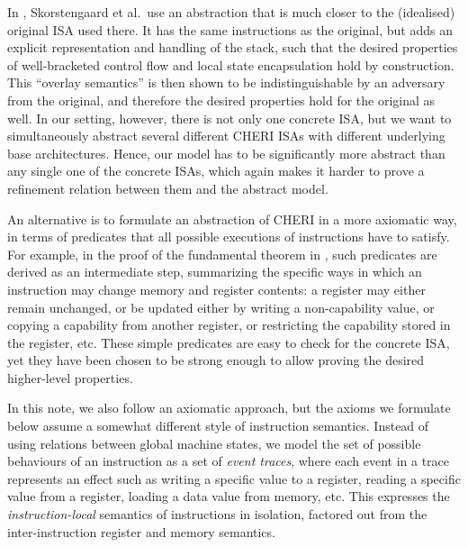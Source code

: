 \documentclass[11pt]{article}
\theoremstyle{definition}
\begin{document}
In \cite{StkTokens}, Skorstengaard et al.~use an abstraction that is
much closer to the (idealised) original ISA used there.
It has the same instructions as the original, but adds an explicit representation and handling of the stack, such that the desired properties of well-bracketed control flow and local state encapsulation hold by construction.
This ``overlay semantics'' is then shown to be indistinguishable by an
adversary from the original, and therefore the desired properties hold for the original as well.
In our setting, however, there is not only one concrete ISA, but we want to simultaneously abstract several different CHERI ISAs with different underlying base architectures.
Hence, our model has to be significantly more abstract than any single one of the concrete ISAs, which again makes it harder to prove a refinement relation between them and the abstract model.

An alternative is to formulate an abstraction of CHERI in a more axiomatic way, in terms of predicates that all possible executions of instructions have to satisfy.
For example, in the proof of the fundamental theorem in \cite{DBLP:conf/esop/SkorstengaardDB18}, such predicates are derived as an intermediate step, summarizing the specific ways in which an instruction may change memory and register contents:
a register may either remain unchanged, or be updated either by writing a non-capability value, or copying a capability from another register, or restricting the capability stored in the register, etc.
These simple predicates are easy to check for the concrete ISA, yet they have been chosen to be strong enough to allow proving the desired higher-level properties.



In this note, we also follow an axiomatic approach, but the axioms we
formulate below assume a somewhat different style of instruction semantics.
Instead of using relations between global machine states, we model the set of possible behaviours of an instruction as a set of \emph{event traces}, where each event in a trace represents an effect such as writing a specific value to a register, reading a specific value from a register, loading a data value from memory, etc.
This expresses the \emph{instruction-local} semantics of instructions in isolation, factored
out from the inter-instruction register and memory semantics.
\end{document}

